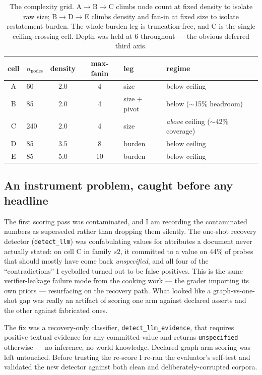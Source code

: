 \documentclass[11pt]{article}
\newcommand{\code}[1]{\texttt{\small #1}}
\begin{document}
\begin{table}[h]
\centering
\begin{tabular}{@{}clccll@{}}
\toprule
cell & $n_{\text{nodes}}$ & density & max-fanin & leg & regime \\
\midrule
A & 60  & 2.0 & 4  & size            & below ceiling \\
B & 85  & 2.0 & 4  & size $+$ pivot  & below ($\sim$15\% headroom) \\
C & 240 & 2.0 & 4  & size            & \emph{above} ceiling ($\sim$42\% coverage) \\
D & 85  & 3.5 & 8  & burden          & below ceiling \\
E & 85  & 5.0 & 10 & burden          & below ceiling \\
\bottomrule
\end{tabular}
\caption{The complexity grid. A$\to$B$\to$C climbs node count at fixed density to isolate raw
size; B$\to$D$\to$E climbs density and fan-in at fixed size to isolate restatement burden. The
whole burden leg is truncation-free, and C is the single ceiling-crossing cell. Depth was held
at 6 throughout --- the obvious deferred third axis.}
\end{table}

\subsection*{An instrument problem, caught before any headline}
The first scoring pass was contaminated, and I am recording the contaminated numbers as
superseded rather than dropping them silently. The one-shot recovery detector
(\code{detect\_llm}) was confabulating values for attributes a document never actually stated:
on cell C in family $s2$, it committed to a value on 44\% of probes that should mostly have come
back \emph{unspecified}, and all four of the ``contradictions'' I eyeballed turned out to be
false positives. This is the same verifier-leakage failure mode from the cooking work --- the
grader importing its own priors --- resurfacing on the recovery path. What looked like a
graph-vs-one-shot gap was really an artifact of scoring one arm against declared asserts and the
other against fabricated ones.

The fix was a recovery-only classifier, \code{detect\_llm\_evidence}, that requires positive
textual evidence for any committed value and returns \code{unspecified} otherwise --- no
inference, no world knowledge. Declared graph-arm scoring was left untouched. Before trusting the
re-score I re-ran the evaluator's self-test and validated the new detector against both clean and
deliberately-corrupted corpora.
\end{document}

